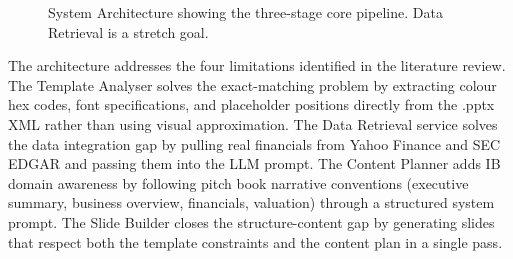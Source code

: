 \begin{figure}[H]
\centering
{}
\caption{System Architecture showing the three-stage core pipeline. Data Retrieval is a stretch goal.}
\label{fig:architecture}
\end{figure}

The architecture addresses the four limitations identified in the literature review. The Template Analyser solves the exact-matching problem by extracting colour hex codes, font specifications, and placeholder positions directly from the .pptx XML rather than using visual approximation. The Data Retrieval service solves the data integration gap by pulling real financials from Yahoo Finance and SEC EDGAR and passing them into the LLM prompt. The Content Planner adds IB domain awareness by following pitch book narrative conventions (executive summary, business overview, financials, valuation) through a structured system prompt. The Slide Builder closes the structure-content gap by generating slides that respect both the template constraints and the content plan in a single pass.

